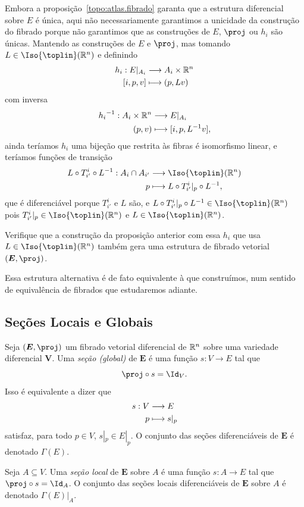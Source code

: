 Embora a proposição~\ref{topo:atlas.fibrado} garanta que a estrutura diferencial sobre $E$ é única, aqui não necessariamente garantimos a unicidade da construção do fibrado porque não garantimos que as construções de $E$, $\proj$ ou $h_i$ são únicas. Mantendo as construções de $E$ e $\proj$, mas tomando $L \in \Iso{\toplin}(\R^n)$ e definindo
	\begin{align*}
	{h_i}: {E|_{A_i}} &\longrightarrow {A_i \times \mathbb{R}^n} \\{[i,p,v]} &\longmapsto {(p,L v)}
	\end{align*}
com inversa	
	\begin{align*}
	{{h_i}^{-1}}: {A_i \times \mathbb{R}^n} &\longrightarrow {E|_{A_i}} \\{(p,v)} &\longmapsto {[i,p,L^{-1}v]},
	\end{align*}
ainda teríamos $h_i$ uma bijeção que restrita às fibras é isomorfismo linear, e teríamos funções de transição
	\begin{align*}
	\func{L \circ T^i_{i'} \circ L\inv}{A_i \cap A_{i'}}{\Iso{\toplin}(\R^n)}{p}{L \circ T^i_{i'}|_p \circ L\inv},
	\end{align*}
que é diferenciável porque $T^i_{i'}$ e $L$ são, e $L \circ T^i_{i'}|_p \circ L\inv \in \Iso{\toplin}(\R^n)$ pois $T^i_{i'}|_p \in \Iso{\toplin}(\R^n)$ e $L \in \Iso{\toplin}(\R^n)$.

\begin{exerc}
Verifique que a construção da proposição anterior com essa $h_i$ que usa $L \in \Iso{\toplin}(\R^n)$ também gera uma estrutura de fibrado vetorial $(\bm E,\proj)$.
\end{exerc}

Essa estrutura alternativa é de fato equivalente à que construímos, num sentido de equivalência de fibrados que estudaremos adiante.





\subsection{Seções Locais e Globais}

\newcommand{\Sec}{\Gamma}

\begin{defi}
Seja $(\bm E,\proj)$ um fibrado vetorial diferencial de $\mathbb{R}^n$ sobre uma variedade diferencial $\bm V$. Uma \emph{seção (global)} de $\bm E$ é uma função $s\colon V \to E$ tal que
	\begin{equation*}
	\proj \circ s = \Id_V.
	\end{equation*}
Isso é equivalente a dizer que
	\begin{align*}
	{s}: {V} &\longrightarrow {E} \\{p} &\longmapsto {s|_p}
	\end{align*}
satisfaz, para todo $p \in V$, $s|_p \in E|_p$. O conjunto das seções diferenciáveis de $\bm E$ é denotado $\Sec(E)$.

Seja $A \subseteq V$. Uma \emph{seção local} de $\bm E$ sobre $A$ é uma função $s\colon A \to E$ tal que $\proj \circ s = \Id_A$. O conjunto das seções locais diferenciáveis de $\bm E$ sobre $A$ é denotado $\Sec(E)|_A$.
\end{defi}

